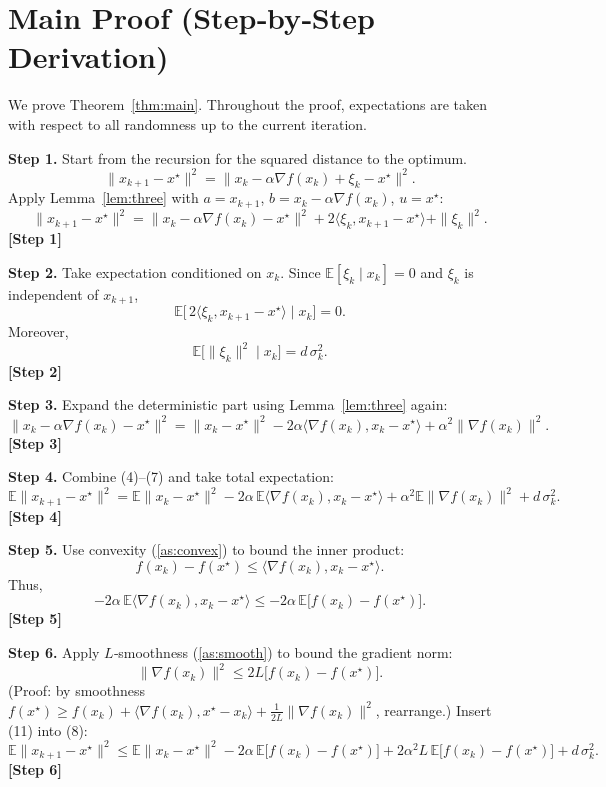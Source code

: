 \documentclass{article}
\newcommand{\E}{\mathbb{E}}
\begin{document}
\section*{Main Proof (Step‑by‑Step Derivation)}
We prove Theorem~\ref{thm:main}. Throughout the proof, expectations are taken with respect to all randomness up to the current iteration.

\bigskip
\noindent\textbf{Step 1.}  Start from the recursion for the squared distance to the optimum.
\[
\|x_{k+1}-x^{\star}\|^{2}
   =\|x_{k}-\alpha\nabla f(x_{k})+\xi_{k}-x^{\star}\|^{2}.
\tag{3}
\]
Apply Lemma~\ref{lem:three} with $a=x_{k+1}$, $b=x_{k}-\alpha\nabla f(x_{k})$, $u=x^{\star}$:
\[
\|x_{k+1}-x^{\star}\|^{2}
   =\|x_{k}-\alpha\nabla f(x_{k})-x^{\star}\|^{2}
     +2\langle \xi_{k},x_{k+1}-x^{\star}\rangle
     +\|\xi_{k}\|^{2}.
\tag{4}
\]
\textbf{[Step 1]}

\bigskip
\noindent\textbf{Step 2.}  Take expectation conditioned on $x_{k}$.
Since $\E[\xi_{k}\mid x_{k}]=0$ and $\xi_{k}$ is independent of $x_{k+1}$,
\[
\E\!\bigl[\,2\langle \xi_{k},x_{k+1}-x^{\star}\rangle\mid x_{k}\bigr]=0.
\tag{5}
\]
Moreover,
\[
\E\!\bigl[\|\xi_{k}\|^{2}\mid x_{k}\bigr]=d\,\sigma_{k}^{2}.
\tag{6}
\]
\textbf{[Step 2]}

\bigskip
\noindent\textbf{Step 3.}  Expand the deterministic part using Lemma~\ref{lem:three} again:
\[
\|x_{k}-\alpha\nabla f(x_{k})-x^{\star}\|^{2}
   =\|x_{k}-x^{\star}\|^{2}
     -2\alpha\langle\nabla f(x_{k}),x_{k}-x^{\star}\rangle
     +\alpha^{2}\|\nabla f(x_{k})\|^{2}.
\tag{7}
\]
\textbf{[Step 3]}

\bigskip
\noindent\textbf{Step 4.}  Combine (4)–(7) and take total expectation:
\[
\E\|x_{k+1}-x^{\star}\|^{2}
   =\E\|x_{k}-x^{\star}\|^{2}
     -2\alpha\,\E\langle\nabla f(x_{k}),x_{k}-x^{\star}\rangle
     +\alpha^{2}\E\|\nabla f(x_{k})\|^{2}
     +d\,\sigma_{k}^{2}.
\tag{8}
\]
\textbf{[Step 4]}

\bigskip
\noindent\textbf{Step 5.}  Use convexity (\ref{as:convex}) to bound the inner product:
\[
f(x_{k})-f(x^{\star})\le \langle\nabla f(x_{k}),x_{k}-x^{\star}\rangle .
\tag{9}
\]
Thus,
\[
-2\alpha\,\E\langle\nabla f(x_{k}),x_{k}-x^{\star}\rangle
\le -2\alpha\,\E\bigl[f(x_{k})-f(x^{\star})\bigr].
\tag{10}
\]
\textbf{[Step 5]}

\bigskip
\noindent\textbf{Step 6.}  Apply $L$‑smoothness (\ref{as:smooth}) to bound the gradient norm:
\[
\|\nabla f(x_{k})\|^{2}\le 2L\bigl[f(x_{k})-f(x^{\star})\bigr].
\tag{11}
\]
(Proof: by smoothness $f(x^{\star})\ge f(x_{k})+\langle\nabla f(x_{k}),x^{\star}-x_{k}\rangle+\frac{1}{2L}\|\nabla f(x_{k})\|^{2}$, rearrange.)  
Insert (11) into (8):
\[
\E\|x_{k+1}-x^{\star}\|^{2}
\le \E\|x_{k}-x^{\star}\|^{2}
   -2\alpha\,\E\bigl[f(x_{k})-f(x^{\star})\bigr]
   +2\alpha^{2}L\,\E\bigl[f(x_{k})-f(x^{\star})\bigr]
   +d\,\sigma_{k}^{2}.
\tag{12}
\]
\textbf{[Step 6]}
\end{document}

